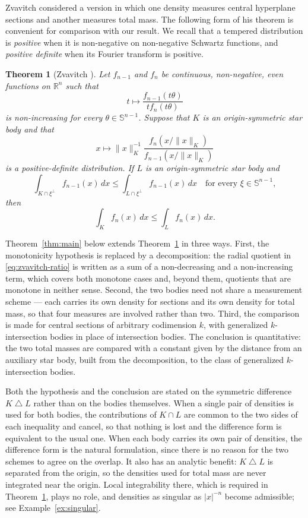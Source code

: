 \documentclass{amsart}
\newtheorem{theorem}{Theorem}
\theoremstyle{remark}
\newcommand{\R}{\mathbb{R}}
\newcommand{\Sph}{\mathbb{S}}
\newcommand{\dd}{\,d}
\begin{document}
Zvavitch considered a version in which one density measures central
hyperplane sections and another measures total mass. The following form of
his theorem is convenient for comparison with our result. We recall that a
tempered distribution is \emph{positive} when it is non-negative on
non-negative Schwartz functions, and \emph{positive definite} when its Fourier
transform is positive.

\begin{theorem}[Zvavitch \cite{Zvavitch2005}]\label{thm:zvavitch}
Let $f_{n-1}$ and $f_n$ be continuous, non-negative, even functions on
$\R^n$ such that
\begin{equation}\label{eq:zvavitch-ratio}
 t\longmapsto \frac{f_{n-1}(t\theta)}{t f_n(t\theta)}
\end{equation}
is non-increasing for every $\theta\in\Sph^{n-1}$. Suppose that $K$ is an
origin-symmetric star body and that
\[
 x\longmapsto
 \lVert x\rVert_K^{-1}
 \frac{f_n(x/\lVert x\rVert_K)}
      {f_{n-1}(x/\lVert x\rVert_K)}
\]
is a positive-definite distribution. If $L$ is an origin-symmetric star body
and
\[
 \int_{K\cap\xi^\perp}f_{n-1}(x)\dd x
 \leq
 \int_{L\cap\xi^\perp}f_{n-1}(x)\dd x
 \quad\text{for every }\xi\in\Sph^{n-1},
\]
then
\[
 \int_K f_n(x)\dd x\leq\int_L f_n(x)\dd x.
\]
\end{theorem}

Theorem~\ref{thm:main} below extends Theorem~\ref{thm:zvavitch} in three ways.
First, the monotonicity hypothesis is replaced by a decomposition: the radial
quotient in \eqref{eq:zvavitch-ratio} is written as a sum of a non-decreasing
and a non-increasing term, which covers both monotone cases and, beyond them,
quotients that are monotone in neither sense. Second, the two bodies need not
share a measurement scheme --- each carries its own density for sections and
its own density for total mass, so that four measures are involved rather than
two. Third, the comparison is made for central sections of arbitrary
codimension $k$, with generalized $k$-intersection bodies in place of
intersection bodies. The conclusion is quantitative: the two total masses are
compared with a constant given by the distance from an auxiliary star body,
built from the decomposition, to the class of generalized $k$-intersection
bodies.

Both the hypothesis and the conclusion are stated on the symmetric difference
$K\mathbin\triangle L$ rather than on the bodies themselves. When a single pair
of densities is used for both bodies, the contributions of $K\cap L$ are common
to the two sides of each inequality and cancel, so that nothing is lost and the
difference form is equivalent to the usual one. When each body carries its own
pair of densities, the difference form is the natural formulation, since there
is no reason for the two schemes to agree on the overlap. It also has an
analytic benefit: $K\mathbin\triangle L$ is separated from the origin, so the
densities used for total mass are never integrated near the origin. Local
integrability there, which is required in Theorem~\ref{thm:zvavitch}, plays no
role, and densities as singular as $|x|^{-n}$ become admissible; see
Example~\ref{ex:singular}.
\end{document}
